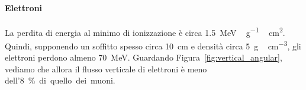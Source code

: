 \paragraph{Elettroni}

La perdita di energia al minimo di ionizzazione è circa \SI{1.5}{MeV\,g^{-1}\,cm^2}.
Quindi, supponendo un soffitto spesso circa \SI{10}{cm} e densità circa \SI{5}{g\,cm^{-3}},
gli elettroni perdono almeno \SI{70}{MeV}.
Guardando Figura~\ref{fig:vertical_angular},
vediamo che allora il flusso verticale di elettroni è meno dell'\SI{8}\% di quello dei muoni.
